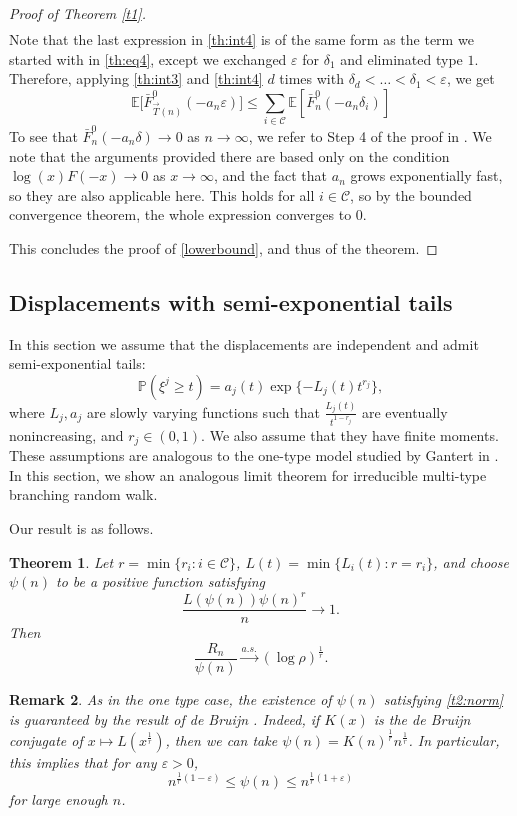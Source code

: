 \documentclass[12pt]{article}
\numberwithin{equation}{section}
\newtheorem{theorem}{Theorem}[section]
\newtheorem{remark}[theorem]{Remark}
\newcommand{\E}{\mathbb{E}}
\begin{document}
\begin{proof}[Proof of Theorem \ref{t1}]
\begin{align}
\end{align}
Note that the last expression in \eqref{th:int4} is of the same form as the term we started with in \eqref{th:eq4}, except we exchanged $\varepsilon$ for $\delta_1$ and eliminated type $1$. Therefore, applying \eqref{th:int3} and \eqref{th:int4} $d$ times with $ \delta_{d} < \dots < \delta_1  < \varepsilon$, we get
\[
\E \big[  \bar{F}^{0}_{\vec{T}(n)}  (-a_n \varepsilon)  \big] \leq \sum_{i \in \mathcal{C}} \E \left[\bar{F}^0_{n}(-a_n \delta_i)\right]
\]
To see that $\bar{F}^0_{n}(-a_{n} \delta) \rightarrow 0$ as $n\rightarrow \infty$, we refer to Step 4 of the proof in \cite{Durrett1983}. We note that the arguments provided there are based only on the condition $\log(x)F(-x) \rightarrow 0$ as $x\rightarrow \infty$, and the fact that $a_n$ grows exponentially fast, so they are also applicable here. This holds for all $i \in \mathcal{C}$, so by the bounded convergence theorem, the whole expression converges to 0.

This concludes the proof of \eqref{lowerbound}, and thus of the theorem. 
\end{proof}
\subsection{Displacements with semi-exponential tails}

In this section we assume that the displacements are independent and admit semi-exponential tails:\begin{equation}\label{semiexp}
    \mathbb{P}\left(\xi^j \geq t\right) = a_j(t) \exp\{-L_j(t)t^{r_j}\},
\end{equation} where $L_j, a_j$ are slowly varying functions such that $\frac {L_j(t)} {t^{1-r_j}}$ are eventually nonincreasing, and $r_j \in (0,1)$. We also assume that they have finite moments. These assumptions are analogous to the one-type model studied by Gantert in \cite{Gantert2000}. In this section, we show an analogous limit theorem for irreducible multi-type branching random walk. 

Our result is as follows.
\begin{theorem}\label{t2}
Let $r = \min\{r_i : i \in \mathcal{C}\}$, $L(t) = \min \{ L_i(t) : r = r_i\}$, and choose $\psi(n)$ to be a positive function satisfying
\begin{equation}\label{t2:norm}
\frac {L(\psi(n))\psi(n)^{r}} n \rightarrow 1.
\end{equation}
Then
\[
\frac {R_n} {\psi(n)} \xrightarrow{a.s.}  (\log \rho)^{\frac 1 {r}}.
\]
\end{theorem}
\begin{remark}\label{t2:remark}
    \emph{As in the one type case, the existence of $\psi(n)$ satisfying \eqref{t2:norm} is guaranteed by the result of de Bruijn \cite{DeBruijn}. Indeed, if $K(x)$ is the de Bruijn conjugate of $x \mapsto L\left(x^{\frac 1 r}\right)$, then we can take $\psi(n)=K(n)^{\frac 1 r}n^{\frac 1 r}$. In particular, this implies that for any $\varepsilon > 0$, \[
    n^{\frac 1 r (1-\varepsilon)} \leq \psi(n) \leq n^{\frac 1 r (1+\varepsilon)}
    \]
    for large enough $n$.
    }
\end{remark}
    
\end{document}
